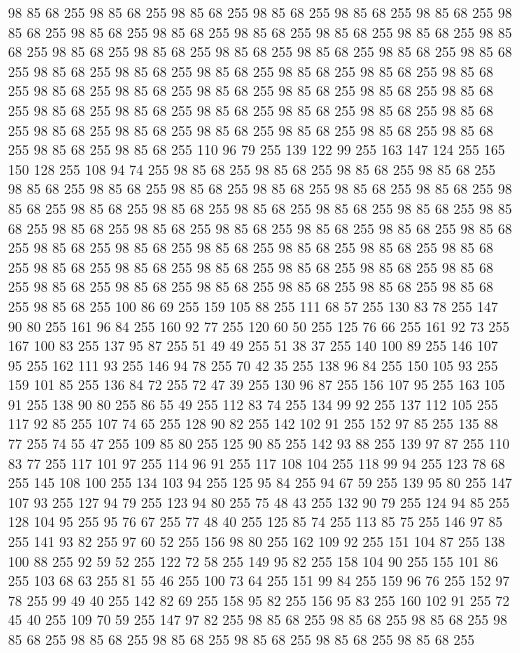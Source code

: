 98 85 68 255 98 85 68 255 98 85 68 255 98 85 68 255 98 85 68 255 98 85 68 255 98 85 68 255 98 85 68 255 98 85 68 255 98 85 68 255 98 85 68 255 98 85 68 255 98 85 68 255 98 85 68 255 98 85 68 255 98 85 68 255 98 85 68 255 98 85 68 255 98 85 68 255 98 85 68 255 98 85 68 255 98 85 68 255 98 85 68 255 98 85 68 255 98 85 68 255 98 85 68 255 98 85 68 255 98 85 68 255 98 85 68 255 98 85 68 255 98 85 68 255 98 85 68 255 98 85 68 255 98 85 68 255 98 85 68 255 98 85 68 255 98 85 68 255 98 85 68 255 98 85 68 255 98 85 68 255 98 85 68 255 98 85 68 255 98 85 68 255 98 85 68 255 98 85 68 255 110 96 79 255 139 122 99 255 163 147 124 255 165 150 128 255 108 94 74 255 98 85 68 255 98 85 68 255 98 85 68 255 98 85 68 255 98 85 68 255 98 85 68 255 98 85 68 255 98 85 68 255 98 85 68 255 98 85 68 255 98 85 68 255 98 85 68 255 98 85 68 255 98 85 68 255
98 85 68 255 98 85 68 255 98 85 68 255 98 85 68 255 98 85 68 255 98 85 68 255 98 85 68 255 98 85 68 255 98 85 68 255 98 85 68 255 98 85 68 255 98 85 68 255 98 85 68 255 98 85 68 255 98 85 68 255 98 85 68 255 98 85 68 255 98 85 68 255 98 85 68 255 98 85 68 255 98 85 68 255 98 85 68 255 98 85 68 255 98 85 68 255 98 85 68 255 98 85 68 255 98 85 68 255 98 85 68 255 100 86 69 255 159 105 88 255 111 68 57 255 130 83 78 255 147 90 80 255 161 96 84 255 160 92 77 255 120 60 50 255 125 76 66 255 161 92 73 255 167 100 83 255 137 95 87 255 51 49 49 255 51 38 37 255 140 100 89 255 146 107 95 255 162 111 93 255 146 94 78 255 70 42 35 255 138 96 84 255 150 105 93 255 159 101 85 255 136 84 72 255 72 47 39 255 130 96 87 255 156 107 95 255 163 105 91 255 138 90 80 255 86 55 49 255 112 83 74 255 134 99 92 255 137 112 105 255 117 92 85 255 107 74 65 255 128 90 82 255 142 102 91 255
152 97 85 255 135 88 77 255 74 55 47 255 109 85 80 255 125 90 85 255 142 93 88 255 139 97 87 255 110 83 77 255 117 101 97 255 114 96 91 255 117 108 104 255 118 99 94 255 123 78 68 255 145 108 100 255 134 103 94 255 125 95 84 255 94 67 59 255 139 95 80 255 147 107 93 255 127 94 79 255 123 94 80 255 75 48 43 255 132 90 79 255 124 94 85 255 128 104 95 255 95 76 67 255 77 48 40 255 125 85 74 255 113 85 75 255 146 97 85 255 141 93 82 255 97 60 52 255 156 98 80 255 162 109 92 255 151 104 87 255 138 100 88 255 92 59 52 255 122 72 58 255 149 95 82 255 158 104 90 255 155 101 86 255 103 68 63 255 81 55 46 255 100 73 64 255 151 99 84 255 159 96 76 255 152 97 78 255 99 49 40 255 142 82 69 255 158 95 82 255 156 95 83 255 160 102 91 255 72 45 40 255 109 70 59 255 147 97 82 255 98 85 68 255 98 85 68 255 98 85 68 255 98 85 68 255 98 85 68 255 98 85 68 255 98 85 68 255 98 85 68 255 98 85 68 255
